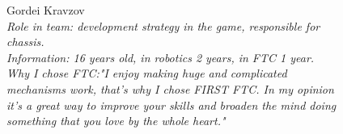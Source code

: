 \begin{figure}[H]
	\begin{minipage}{0.47\linewidth}
		Gordei Kravzov\\
		\emph{Role in team: development strategy in the game, responsible for chassis.\\ }
		\emph{Information: 16 years old, in robotics 2 years, in FTC 1 year. \\ } 
		\emph{Why I chose FTC:"I enjoy making huge and complicated mechanisms work, that's why I chose FIRST FTC. In my opinion it's a great way to improve your skills and broaden the mind doing something that you love by the whole heart."}		
	\end{minipage}
	\hfill
	\begin{minipage}[h]{0.47\linewidth}
		\\
	\end{minipage}
\end{figure}

\fillpage


